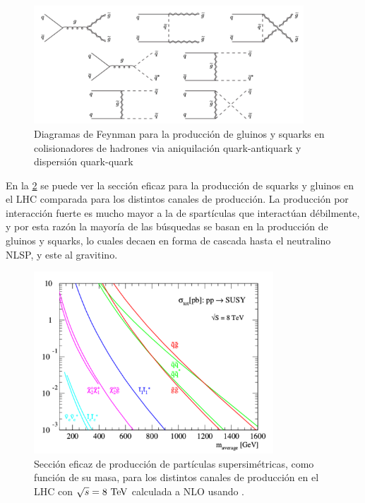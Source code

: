 \begin{figure}[h]
  \centering \includegraphics[width=0.9\textwidth]{figures/figure_103}
  \caption{Diagramas de Feynman para la producción de gluinos y
    squarks en colisionadores de hadrones via aniquilación
    quark-antiquark y dispersión quark-quark}
  \label{fig:strongprod2}
\end{figure}






En la \cref{fig:xs_lhc_8tev} se puede ver la sección eficaz para la
producción de squarks y gluinos en el LHC comparada para los distintos
canales de producción. La producción por interacción fuerte es mucho
mayor a la de spartículas que interactúan débilmente, y por esta razón
la mayoría de las búsquedas se basan en la producción de gluinos y
squarks, lo cuales decaen en forma de cascada hasta el neutralino
NLSP, y este al gravitino.


\begin{figure}[h]
  \includegraphics[width=0.8\textwidth]{figures/susy_lhc_xs_8tev}
  \caption{Sección eficaz de producción de partículas supersimétricas,
    como función de su masa, para los distintos canales de producción
    en el LHC con $\sqrt{s} = 8 \tev$ calculada a NLO usando
    \prospino.}
  \label{fig:xs_lhc_8tev}
\end{figure}
